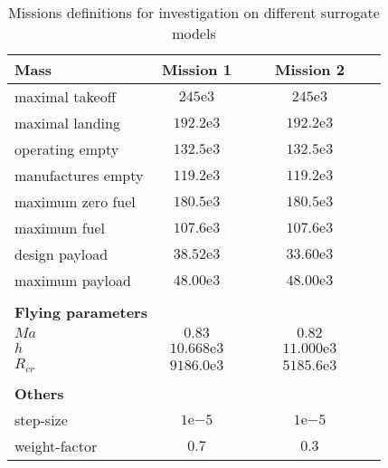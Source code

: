 \begin{table}[!h]
    \centering
    \begin{tabular}{l| c c c c c c }
        \textbf{Mass} & \multicolumn{1}{c}{\textbf{Mission 1}} &&& 
        \multicolumn{1}{c}{\textbf{Mission 2}}\\
        \hline
        maximal takeoff & $245 \mathrm{e}{3}$ &&&      $245\mathrm{e}{3}$         &&\\
        maximal landing & $192.2 \mathrm{e}{3}$ &&&      $192.2\mathrm{e}{3}$         &&\\
        operating empty & $132.5\mathrm{e}{3}$ &&&      $132.5\mathrm{e}{3} $         &&\\
        manufactures empty & $119.2\mathrm{e}{3} $ &&&      $119.2\mathrm{e}{3} $         &&\\
        maximum zero fuel  & $180.5\mathrm{e}{3} $ &&&      $180.5\mathrm{e}{3} $         &&\\
        maximum fuel & $107.6\mathrm{e}{3}$ &&&      $107.6\mathrm{e}{3}$         &&\\
        design payload & $38.52\mathrm{e}{3}$ &&&      $33.60\mathrm{e}{3} $         &&\\
        maximum payload & $48.00\mathrm{e}{3}$ &&&      $48.00\mathrm{e}{3}  $         &&\\
        \hline
        &  &&&               &&\\
        \textbf{Flying parameters} &  &&&               && \\
        \hline 
        $Ma$ & $0.83$ &&&      $0.82$         &&\\
        $h$ & $10.668\mathrm{e}{3}$ &&&      $11.000\mathrm{e}{3}  $         &&\\
        $R_{cr}$ & $9186.0\mathrm{e}{3} $ &&&      $5185.6\mathrm{e}{3} $         &&\\
        \hline
        &  &&&               &&\\
        \textbf{Others} &  &&&               && \\
        \hline 
        step-size & $1\mathrm{e}{-5} $&&&      $1\mathrm{e}{-5}$         &&\\
        weight-factor & $0.7$ &&&      $0.3$         &&\\
        
    \end{tabular}
    \caption{Missions definitions for investigation on different surrogate models}
    \label{tab_2}
\end{table} 


